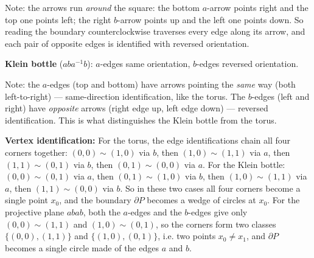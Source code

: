 \documentclass[11pt]{report}
\begin{document}
\begin{exbox}
Note: the arrows run \emph{around} the square: the bottom $a$-arrow points right and the top one points left; the right $b$-arrow points up and the left one points down. So reading the boundary counterclockwise traverses every edge along its arrow, and each pair of opposite edges is identified with reversed orientation.

\textbf{Klein bottle} ($aba^{-1}b$): $a$-edges same orientation, $b$-edges reversed orientation.

\begin{center}
\end{center}

Note: the $a$-edges (top and bottom) have arrows pointing the \emph{same} way (both left-to-right) --- same-direction identification, like the torus. The $b$-edges (left and right) have \emph{opposite} arrows (right edge up, left edge down) --- reversed identification. This is what distinguishes the Klein bottle from the torus.

\textbf{Vertex identification:} For the torus, the edge identifications chain all four corners together: $(0,0) \sim (1,0)$ via $b$, then $(1,0) \sim (1,1)$ via $a$, then $(1,1) \sim (0,1)$ via $b$, then $(0,1) \sim (0,0)$ via $a$. For the Klein bottle: $(0,0) \sim (0,1)$ via $a$, then $(0,1) \sim (1,0)$ via $b$, then $(1,0) \sim (1,1)$ via $a$, then $(1,1) \sim (0,0)$ via $b$. So in these two cases all four corners become a single point $x_0$, and the boundary $\partial P$ becomes a wedge of circles at $x_0$. For the projective plane $abab$, both the $a$-edges and the $b$-edges give only $(0,0) \sim (1,1)$ and $(1,0) \sim (0,1)$, so the corners form two classes $\{(0,0), (1,1)\}$ and $\{(1,0), (0,1)\}$, i.e. two points $x_0 \neq x_1$, and $\partial P$ becomes a single circle made of the edges $a$ and $b$.
\end{exbox}
\end{document}
